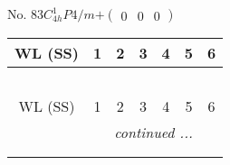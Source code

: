 \documentclass[fleqn,9pt,landscape]{jsarticle}
\begin{document}
\newpage
No. 83\quad$C_{4h}^{1}$\quad$P4/m$\quad[ tetragonal ]\quad$+\begin{pmatrix} 0 & 0 & 0 \end{pmatrix}$
\begin{center}
\renewcommand{\arraystretch}{1.2}
\begin{longtable}{ccccccc}
 \hline \hline
WL (SS) & 1 & 2 & 3 & 4 & 5 & 6 \\ \hline \endfirsthead

\multicolumn{6}{l}{\tablename\ \thetable{}} \\
 \hline \hline
WL (SS) & 1 & 2 & 3 & 4 & 5 & 6 \\ \hline \endhead

 \hline \hline
\multicolumn{6}{r}{\footnotesize\it continued ...} \\ \endfoot

 \hline \hline
\multicolumn{6}{r}{} \\ \endlastfoot


\end{longtable}
\end{center}
\end{document}
